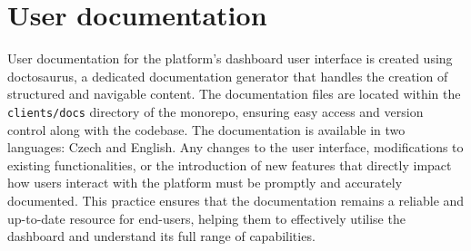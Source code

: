 \section{User documentation}
\label{attachments:programming-platform.docs}
User documentation for the platform's dashboard user interface is created using \gls{doctosaurus}, a dedicated documentation generator that handles the creation of structured and navigable content. 
The documentation files are located within the \texttt{clients/docs} directory of the monorepo, ensuring easy access and version control along with the codebase.
The documentation is available in two languages: Czech and English. 
Any changes to the user interface, modifications to existing functionalities, or the introduction of new features that directly impact how users interact with the platform must be promptly and accurately documented. 
This practice ensures that the documentation remains a reliable and up-to-date resource for end-users, helping them to effectively utilise the dashboard and understand its full range of capabilities. 


